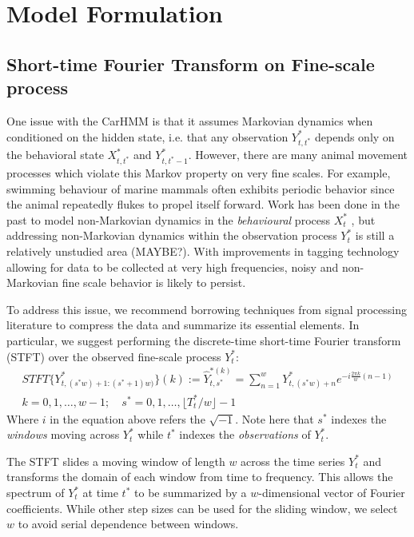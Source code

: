 
\section{Model Formulation}

\subsection{Short-time Fourier Transform on Fine-scale process}

One issue with the CarHMM is that it assumes Markovian dynamics when conditioned on the hidden state, i.e. that any observation $Y^*_{t,t^*}$ depends only on the behavioral state $X^*_{t,t^*}$ and $Y^*_{t,t^*-1}$. However, there are many animal movement processes which violate this Markov property on very fine scales. For example, swimming behaviour of marine mammals often exhibits periodic behavior since the animal repeatedly flukes to propel itself forward. Work has been done in the past to model non-Markovian dynamics in the \textit{behavioural} process $X^*_t$ \cite{Langrock:2012}, but addressing non-Markovian dynamics within the observation process $Y^*_t$ is still a relatively unstudied area (MAYBE?). With improvements in tagging technology allowing for data to be collected at very high frequencies, noisy and non-Markovian fine scale behavior is likely to persist.

To address this issue, we recommend borrowing techniques from signal processing literature to compress the data and summarize its essential elements. In particular, we suggest performing the discrete-time short-time Fourier transform (STFT) over the observed fine-scale process $Y^*_t$:
%
\begin{align*}
    STFT\{Y^*_{t,(s^*w)+1:(s^*+1)w) }\}(k) := \hat{Y}^{*(k)}_{t,s^*} = \sum_{n = 1}^{w} Y^*_{t,(s^*w)+n}e^{-i \frac{2\pi k}{w} (n-1)} \\ k = 0, 1, \ldots, w-1; \quad s^* = 0,1, \ldots, \lfloor T^*_t / w \rfloor - 1
\end{align*}
%
Where $i$ in the equation above refers the $\sqrt{-1}$. Note here that $s^*$ indexes the \textit{windows} moving across $Y^*_t$ while $t^*$ indexes the \textit{observations} of $Y^*_t$.

The STFT slides a moving window of length $w$ across the time series $Y_t^*$ and transforms the domain of each window from time to frequency. This allows the spectrum of $Y_t^*$ at time $t^*$ to be summarized by a $w$-dimensional vector of Fourier coefficients. While other step sizes can be used for the sliding window, we select $w$ to avoid serial dependence between windows.

